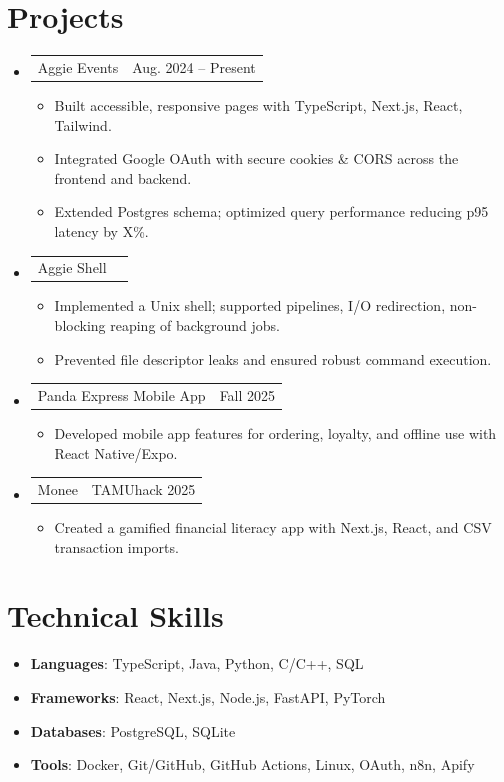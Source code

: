 \documentclass[letterpaper,11pt]{article}
\makeatletter
\newcommand{\resumeItem}[1]{
  \item\small{{#1 \vspace{-2pt}}}
}
\newcommand{\resumeProjectHeading}[2]{
  \item
  \begin{tabular*}{0.97\textwidth}{l@{\extracolsep{\fill}}r}
    \small#1 & #2 \\
  \end{tabular*}\vspace{-7pt}
}
\newcommand{\resumeSubHeadingListStart}{\begin{itemize}[leftmargin=0.15in, label={}]}
\newcommand{\resumeSubHeadingListEnd}{\end{itemize}}
\newcommand{\resumeItemListStart}{\begin{itemize}}
\newcommand{\resumeItemListEnd}{\end{itemize}\vspace{-5pt}}
\makeatother
\begin{document}
\section{Projects}
\resumeSubHeadingListStart
  \resumeProjectHeading
    {Aggie Events}{Aug. 2024 -- Present}
    \resumeItemListStart
      \resumeItem{Built accessible, responsive pages with TypeScript, Next.js, React, Tailwind.}
      \resumeItem{Integrated Google OAuth with secure cookies \& CORS across the frontend and backend.}
      \resumeItem{Extended Postgres schema; optimized query performance reducing p95 latency by {X}\%.}
    \resumeItemListEnd
    
  \resumeProjectHeading
    {Aggie Shell}{}
    \resumeItemListStart
      \resumeItem{Implemented a Unix shell; supported pipelines, I/O redirection, non-blocking reaping of background jobs.}
      \resumeItem{Prevented file descriptor leaks and ensured robust command execution.}
    \resumeItemListEnd
    
  \resumeProjectHeading
    {Panda Express Mobile App}{Fall 2025}
    \resumeItemListStart
      \resumeItem{Developed mobile app features for ordering, loyalty, and offline use with React Native/Expo.}
    \resumeItemListEnd
    
  \resumeProjectHeading
    {Monee}{TAMUhack 2025}
    \resumeItemListStart
      \resumeItem{Created a gamified financial literacy app with Next.js, React, and CSV transaction imports.}
    \resumeItemListEnd
\resumeSubHeadingListEnd

\section{Technical Skills}
\resumeSubHeadingListStart
  \resumeItemListStart
    \resumeItem{\textbf{Languages}{: TypeScript, Java, Python, C/C++, SQL}}
    \resumeItem{\textbf{Frameworks}{: React, Next.js, Node.js, FastAPI, PyTorch}}
    \resumeItem{\textbf{Databases}{: PostgreSQL, SQLite}}
    \resumeItem{\textbf{Tools}{: Docker, Git/GitHub, GitHub Actions, Linux, OAuth, n8n, Apify}}
  \resumeItemListEnd
\resumeSubHeadingListEnd
\end{document}
